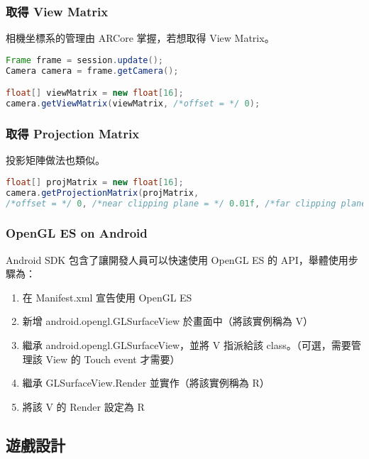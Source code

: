 \subsubsection{取得 View Matrix}

相機坐標系的管理由 ARCore 掌握，若想取得 View Matrix。

\begin{lstlisting}[language=Java, caption=取得 View Matrix]
Frame frame = session.update();
Camera camera = frame.getCamera();

float[] viewMatrix = new float[16];
camera.getViewMatrix(viewMatrix, /*offset = */ 0);
\end{lstlisting}

\subsubsection{取得 Projection Matrix}

投影矩陣做法也類似。

\begin{lstlisting}[language=Java, caption=取得 Projection Matrix]
float[] projMatrix = new float[16];
camera.getProjectionMatrix(projMatrix,
/*offset = */ 0, /*near clipping plane = */ 0.01f, /*far clipping plane = */ 15.0f);
\end{lstlisting}

\subsubsection{OpenGL ES on Android}

Android SDK 包含了讓開發人員可以快速使用 OpenGL ES 的 API，舉體使用步驟為：

\begin{enumerate}
    \item 在 Manifest.xml 宣告使用 OpenGL ES
    \item 新增 android.opengl.GLSurfaceView 於畫面中（將該實例稱為 V）
    \item 繼承 android.opengl.GLSurfaceView，並將 V 指派給該 class。（可選，需要管理該 View 的 Touch event 才需要）
    \item 繼承 GLSurfaceView.Render 並實作（將該實例稱為 R）
    \item 將該 V 的 Render 設定為 R
\end{enumerate}


\subsection{遊戲設計}

